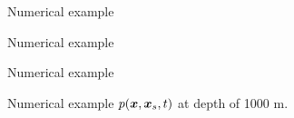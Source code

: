 \documentclass[xcolor=dvipsnames,notes]{beamer}
\begin{document}
\begin{frame}{Numerical example}
\begin{figure}
\end{figure}
\end{frame}
\begin{frame}{Numerical example}
%
\begin{figure}
\end{figure}
\end{frame}
\begin{frame}{Numerical example}
%
\begin{figure}
\end{figure}
\end{frame}
\begin{frame}{Numerical example}
$p(\mbox{\boldmath $x$},\mbox{\boldmath $x$}_s,t)$ at depth of 1000 m.
%
\begin{figure}
\end{figure}
\end{frame}
\end{document}
